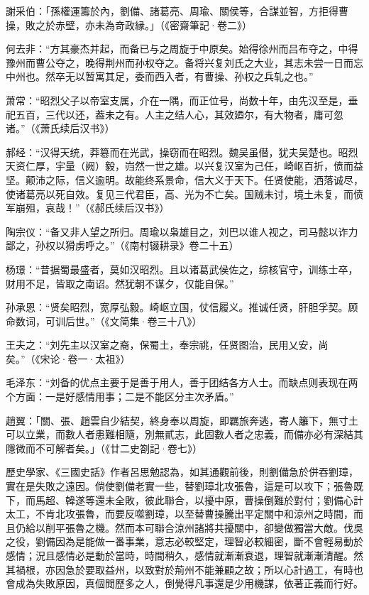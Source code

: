 謝采伯：「孫權運籌於內，劉備、諸葛亮、周瑜、關侯等，合謀並智，方拒得曹操，敗之於赤壁，亦未為竒政縁。」（《密齋筆記·卷二》）

何去非：“方其豪杰并起，而备已与之周旋于中原矣。始得徐州而吕布夺之，中得豫州而曹公夺之，晚得荆州而孙权夺之。备将兴复刘氏之大业，其志未尝一日而忘中州也。然卒无以暂寓其足，委而西入者，有曹操、孙权之兵轧之也。”

萧常：“昭烈父子以帝室支属，介在一隅，而正位号，尚数十年，由先汉至是，垂祀五百，三代以还，葢未之有。人主之结人心，其效廼尔，有大物者，庸可忽诸。”（《萧氏续后汉书》）

郝经：“汉得天统，莽簒而在光武，操窃而在昭烈。魏吴虽僣，犹夫吴楚也。昭烈天资仁厚，宇量（阙）毅，岿然一世之雄。以兴复汉室为己任，崎岖百折，偾而益坚。颠沛之际，信义逾明。故能终系景命，信大义于天下。任贤使能，洒落诚尽，使诸葛亮以死自效。复见三代君臣，高、光为不亡矣。国贼未讨，境土未复，而偾军崩殂，哀哉！”（《郝氏续后汉书》）

陶宗仪：“备又非人望之所归。周瑜以枭雄目之，刘巴以谁人视之，司马懿以诈力鄙之，孙权以猾虏呼之。”（《南村辍耕录》卷二十五）

杨璟：“昔据蜀最盛者，莫如汉昭烈。且以诸葛武侯佐之，综核官守，训练士卒，财用不足，皆取之南诏。然犹朝不谋夕，仅能自保。”

孙承恩：“贤矣昭烈，宽厚弘毅。崎岖立国，仗信履义。推诚任贤，肝胆孚契。顾命数词，可训后世。”（《文简集·卷三十八》）

王夫之：“刘先主以汉室之裔，保蜀土，奉宗祧，任贤图治，民用乂安，尚矣。”（《宋论·卷一·太祖》）

毛泽东：“刘备的优点主要于是善于用人，善于团结各方人士。而缺点则表现在两个方面：一是好感情用事；二是不能区分主次矛盾。”

趙翼：「關、張、趙雲自少結契，終身奉以周旋，即羈旅奔逃，寄人籬下，無寸土可以立業，而數人者患難相隨，別無貳志，此固數人者之忠義，而備亦必有深結其隱微而不可解者矣。」（《廿二史劄記·卷七》）

歷史學家、《三國史話》作者呂思勉認為，如其通觀前後，則劉備急於併吞劉璋，實在是失敗之遠因。倘使劉備老實一些，替劉璋北攻張魯，這是可以攻下；張魯既下，而馬超、韓遂等還未全敗，彼此聯合，以擾中原，曹操倒難於對付；劉備心計太工，不肯北攻張魯，而要反噬劉璋，以至替曹操騰出平定關中和涼州之時間，而且仍給以削平張魯之機。然而本可聯合涼州諸將共擾關中，卻變做獨當大敵。伐吳之役，劉備因為是能做一番事業，意志必較堅定，理智必較細密，斷不會輕易動於感情；況且感情必是動於當時，時間稍久，感情就漸漸衰退，理智就漸漸清醒。然其禍根，亦因急於要取益州，以致對於荊州不能兼顧之故；所以心計過工，有時也會成為失敗原因，真個閲歷多之人，倒覺得凡事還是少用機謀，依著正義而行好。

